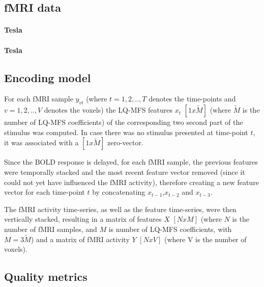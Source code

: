 \cite{HBI+14,HDH+2015}

\subsection*{fMRI data}

\paragraph{\unit[3]{Tesla}}
\paragraph{\unit[7]{Tesla}}

\subsection*{Encoding model}




For each f{MRI} sample $y_{vt}$ (where $t=1,2,..,T$ denotes the time-points and $v=1,2,..,V$ denotes the voxels) the LQ-MFS features $x_{t}$ $[1x\widetilde{M}]$ (where $\widetilde{M}$ is the number of LQ-MFS coefficients) of the corresponding two second part of the stimulus was computed. In case there was no stimulus presented at time-point $t$, it was associated with a $[1x\widetilde{M}]$ zero-vector. 


Since the BOLD response is delayed, for each f{MRI} sample, the previous features were temporally stacked and the most recent feature vector removed (since it could not yet have influenced the f{MRI} activity), therefore creating a new feature vector for each time-point $t$ by concatenating $x_{t-1}$,$x_{t-2}$ and $x_{t-3}$.  

The f{MRI} activity time-series, as well as the feature time-series, were then vertically stacked, resulting in a matrix of features $X$ $[NxM]$ (where $N$ is the number of f{MRI} samples, and $M$ is number of LQ-MFS coefficients, with $M=3\widetilde{M}$) and a matrix of f{MRI} activity $Y$ $[NxV]$ (where V is the number of voxels).


\subsection*{Quality metrics}

